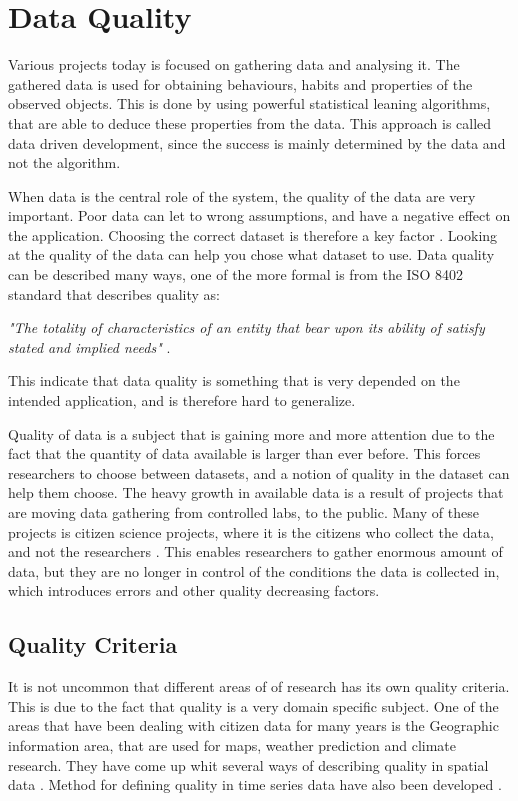 \chapter{Data Quality}
Various projects today is focused on gathering data and analysing it. The gathered data is used for obtaining behaviours, habits and properties of the observed objects. This is done by using powerful statistical leaning algorithms, that are able to deduce these properties from the data. This approach is called data driven development, since the success is mainly determined by the data and not the algorithm. 

When data is the central role of the system, the quality of the data are very important. Poor data can let to wrong assumptions, and have a negative effect on the application. Choosing the correct dataset is therefore a key factor \cite{RefWorks:3}. Looking at the quality of the data can help you chose what dataset to use. Data quality can be described many ways, one of the more formal is from the ISO 8402 standard that describes quality as: 

\begin{adjustwidth}{2.5em}{2.5em}
\emph{"The totality of characteristics of an entity that bear upon its ability of satisfy stated and implied needs"} \cite{RefWorks:5}.
\end{adjustwidth}

This indicate that data quality is something that is very depended on the intended application, and is therefore hard to generalize. 

Quality of data is a subject that is gaining more and more attention due to the fact that the quantity of data available is larger than ever before. This forces researchers to choose between datasets, and a notion of quality in the dataset can help them choose. The heavy growth in available data is a result of projects that are moving data gathering from controlled labs, to the public. Many of these projects is citizen science projects, where it is the citizens who collect the data, and not the researchers \cite{RefWorks:2}. This enables researchers to gather enormous amount of data, but they are no longer in control of the conditions the data is collected in, which introduces errors and other quality decreasing factors. 

\section{Quality Criteria}
It is not uncommon that different areas of of research has its own quality criteria. This is due to the fact that quality is a very domain specific subject. One of the areas that have been dealing with citizen data for many years is the Geographic information area, that are used for maps, weather prediction and climate research. They have come up whit several ways of describing quality in spatial data \cite{RefWorks:7}. Method for defining quality in time series data have also been developed  \cite{RefWorks:6}. 

